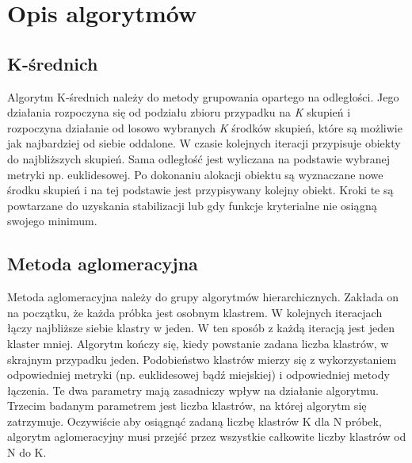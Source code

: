 \documentclass{classrep}
\begin{document}
    \section{Opis algorytmów} {

        \subsection{K-średnich} {
            Algorytm K-średnich należy do metody grupowania opartego na odległości.
            Jego działania rozpoczyna się od podziału zbioru przypadku na \textit{K}
            skupień i rozpoczyna działanie od losowo wybranych \textit{K} środków
            skupień, które są możliwie jak najbardziej od siebie oddalone. W czasie
            kolejnych iteracji przypisuje obiekty do najbliższych skupień. Sama
            odległość jest wyliczana na podstawie wybranej metryki np. euklidesowej. Po
            dokonaniu alokacji obiektu są wyznaczane nowe środku skupień i na tej
            podstawie jest przypisywany kolejny obiekt. Kroki te są powtarzane do
            uzyskania stabilizacji lub gdy funkcje kryterialne nie osiągną swojego
            minimum.
        }

        \subsection{Metoda aglomeracyjna} {
            Metoda aglomeracyjna należy do grupy algorytmów hierarchicznych.
            Zakłada on na początku, że każda próbka jest osobnym klastrem. W
            kolejnych iteracjach łączy najbliższe siebie klastry w jeden. W ten sposób
            z każdą iteracją jest jeden klaster mniej. Algorytm kończy się, kiedy
            powstanie zadana liczba klastrów, w skrajnym przypadku jeden. Podobieństwo
            klastrów mierzy się z wykorzystaniem odpowiedniej metryki (np. euklidesowej
            bądź miejskiej) i odpowiedniej metody łączenia. Te dwa parametry mają
            zasadniczy wpływ na działanie algorytmu. Trzecim badanym parametrem jest
            liczba klastrów, na której algorytm się zatrzymuje. Oczywiście aby osiągnąć
            zadaną liczbę klastrów K dla N próbek, algorytm aglomeracyjny musi przejść
            przez wszystkie całkowite liczby klastrów od N do K.
        }

}
\end{document}

